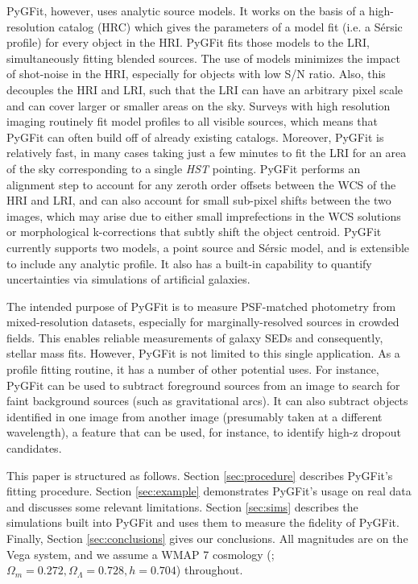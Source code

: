 \documentclass[preprint]{aastex}
\newcommand{\sersic}{S\'{e}rsic}
\newcommand{\pygfit}{PyGFit}
\begin{document}
\pygfit{}, however, uses analytic source models.  It works on the basis of a high-resolution catalog (HRC) which gives the parameters of a model fit (i.e. a \sersic{} profile) for every object in the HRI.  \pygfit{} fits those models to the LRI, simultaneously fitting blended sources.  The use of models minimizes the impact of shot-noise in the HRI, especially for objects with low S/N ratio.  Also, this decouples the HRI and LRI, such that the LRI can have an arbitrary pixel scale and can cover larger or smaller areas on the sky.  Surveys with high resolution imaging routinely fit model profiles to all visible sources, which means that \pygfit{} can often build off of already existing catalogs.  Moreover, \pygfit{} is relatively fast, in many cases taking just a few minutes to fit the LRI for an area of the sky corresponding to a single {\itshape HST} pointing.  \pygfit{} performs an alignment step to account for any zeroth order offsets between the WCS of the HRI and LRI, and can also account for small sub-pixel shifts between the two images, which may arise due to either small imprefections in the WCS solutions or morphological k-corrections that subtly shift the object centroid.  \pygfit{} currently supports two models, a point source and \sersic{} model, and is extensible to include any analytic profile.  It also has a built-in capability to quantify uncertainties via simulations of artificial galaxies.

The intended purpose of \pygfit{} is to measure PSF-matched photometry from mixed-resolution datasets, especially for marginally-resolved sources in crowded fields.  This enables reliable measurements of galaxy SEDs and consequently, stellar mass fits.  However, \pygfit{} is not limited to this single application.  As a profile fitting routine, it has a number of other potential uses.  For instance, \pygfit{} can be used to subtract foreground sources from an image to search for faint background sources (such as gravitational arcs).  It can also subtract objects identified in one image from another image (presumably taken at a different wavelength), a feature that can be used, for instance, to identify high-z dropout candidates.

This paper is structured as follows.  Section \ref{sec:procedure} describes \pygfit{}'s fitting procedure.  Section \ref{sec:example} demonstrates \pygfit{}'s usage on real data and discusses some relevant limitations.  Section \ref{sec:sims} describes the simulations built into \pygfit{} and uses them to measure the fidelity of \pygfit{}.  Finally, Section \ref{sec:conclusions} gives our conclusions.  All magnitudes are on the Vega system, and we assume a WMAP 7 cosmology (\citealt{komatsu11}; $\Omega_m=0.272, \Omega_\Lambda=0.728, h=0.704$) throughout.
\end{document}
